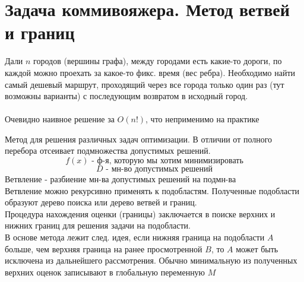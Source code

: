 \documentclass[discrete.tex]{subfiles}
\begin{document}
    \section{Задача коммивояжера. Метод ветвей и границ}

    \begin{task}
        Дали $n$ городов (вершины графа), между городами есть какие-то дороги,
        по каждой можно проехать за какое-то фикс. время (вес ребра).
        Необходимо найти самый дешевый маршрут, проходящий через все города
        только один раз (тут возможны варианты) с последующим возвратом в
        исходный город.\\
        \\
        Очевидно наивное решение за $O(n!)$, что неприменимо на практике
    \end{task}

    \begin{Definition}
        Метод для решения различных задач оптимизации. В отличии от полного
        перебора отсеивает подмножества допустимых решений.
        \[f(x) \text{ - ф-я, которую мы хотим минимизировать}\]
        \[D \text{ - мн-во допустимых решений}\]
        Ветвление - разбиение мн-ва допустимых решений на подмн-ва\\
        Ветвление можно рекурсивно применять к подобластям. Полученные
        подобласти образуют дерево поиска или дерево ветвей и границ. \\
        Процедура нахождения оценки (границы) заключается в поиске верхних и
        нижних границ для решения задачи на подобласти.\\
        В основе метода лежит след. идея, если нижняя граница на подобласти
        $A$ больше, чем верхняя граница на ранее просмотренной $B$, то
        $A$ может быть исключена из дальнейшего рассмотрения.
        Обычно минимальную из полученных верхних оценок записывают
        в глобальную переменную $M$
    \end{Definition}
\end{document}
